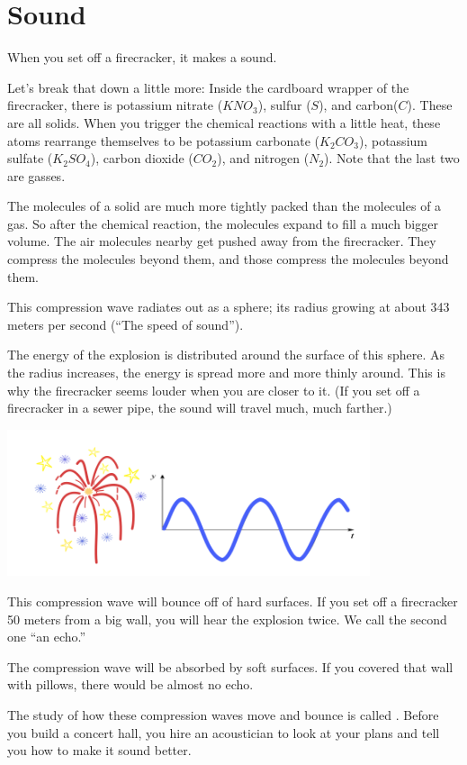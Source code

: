 \chapter{Sound}

When you set off a firecracker, it makes a sound.

Let's break that down a little more: Inside the cardboard wrapper of
the firecracker, there is potassium nitrate ($KNO_3$), sulfur ($S$),
and carbon($C$).  These are all solids. When you trigger the chemical
reactions with a little heat, these atoms rearrange themselves to be
potassium carbonate ($K_2CO_3$), potassium sulfate ($K_2SO_4$), carbon
dioxide ($CO_2$), and nitrogen ($N_2$). Note that the last two are
gasses.

The molecules of a solid are much more tightly packed than the
molecules of a gas. So after the chemical reaction, the molecules
expand to fill a much bigger volume. The air molecules nearby get
pushed away from the firecracker.  They compress the molecules beyond
them, and those compress the molecules beyond them.

This compression wave radiates out as a sphere; its radius growing at
about 343 meters per second (``The speed of sound'').

The energy of the explosion is distributed around the surface of this
sphere. As the radius increases, the energy is spread more and more
thinly around. This is why the firecracker seems louder when you are
closer to it. (If you set off a firecracker in a sewer pipe, the sound
will travel much, much farther.)

\includegraphics[width=0.8\textwidth]{firework.png}


This compression wave will bounce off of hard surfaces. If you set off
a firecracker 50 meters from a big wall, you will hear the explosion
twice. We call the second one ``an echo.''

The compression wave will be absorbed by soft surfaces. If you covered
that wall with pillows, there would be almost no echo.

The study of how these compression waves move and bounce is called
. Before you build a concert hall, you hire an
acoustician to look at your plans and tell you how to make it sound
better.

